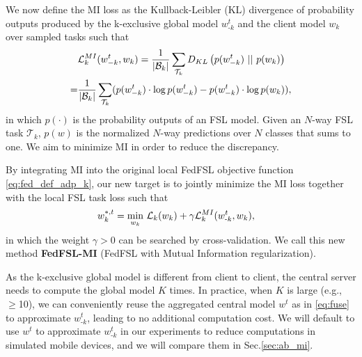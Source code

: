 We now define the MI loss as the Kullback-Leibler (KL) divergence of probability outputs produced by the k-exclusive global model $w^{t}_{\text{-}k}$ and the client model $w_k$ over sampled tasks such that
\begin{equation}
\begin{split}
&\mathcal{L}_k^{MI}(w^t_{-k}, w_k) = \frac{1}{|\mathcal{B}_k|} \sum_{\mathcal{T}_k} D_{KL} \left (p(w^t_{-k})~ ||~ p(w_k) \right ) \\
=&\frac{1}{|\mathcal{B}_k|} \sum_{\mathcal{T}_k} (p(w^t_{-k}) \cdot \log p(w^t_{-k}) - p(w^t_{-k}) \cdot \log p(w_k)), \\
\end{split}
\label{eq:loss_kd}
\end{equation}
in which $p(\cdot)$ is the probability outputs of an FSL model. Given an $N$-way FSL task $\mathcal{T}_k$, $p(w)$ is the normalized $N$-way predictions over $N$ classes that sums to one. We aim to minimize MI in order to reduce the discrepancy.

By integrating MI into the original local FedFSL objective function \eqref{eq:fed_def_adp_k},
our new target is to jointly minimize the MI loss together with the local FSL task loss such that
\begin{equation}
\begin{split}
&w^{*,t}_{k}=\underset{w_k}{\text{min}} \ \mathcal{L}_k(w_k) + \gamma \mathcal{L}_k^{MI}(w^{t}_{\text{-}k}, w_k),
\end{split}
\label{eq:fed_maml_mi}
\end{equation}
in which the weight $\gamma>0$ can be searched by cross-validation. We call this new method \textbf{FedFSL-MI} (FedFSL with Mutual Information regularization).

As the k-exclusive global model is different from client to client, the central server needs to compute the global model $K$ times.
In practice, when $K$ is large (e.g., $\ge$10), we can conveniently reuse the aggregated central model $w^{t}$ as in \eqref{eq:fuse} to
approximate $w^{t}_{\text{-}k}$, leading to no additional computation cost. We will default to use $w^t$ to approximate $w^{t}_{\text{-}k}$ in our experiments to reduce computations in simulated mobile devices, and we will compare them in Sec.\ref{sec:ab_mi}.



